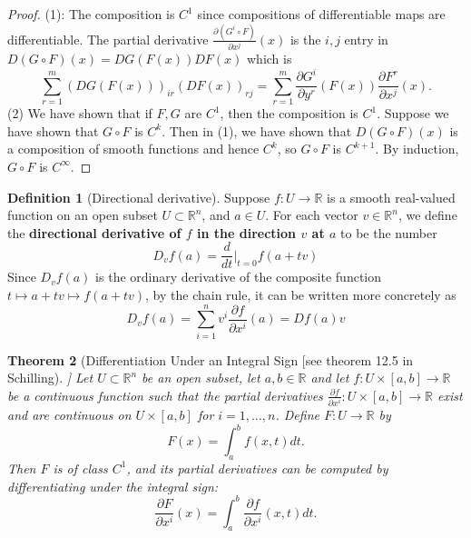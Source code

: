 \documentclass[reqno]{amsart}
\theoremstyle{plain}%
\newtheorem{theorem}{Theorem}[section]
\theoremstyle{definition}
\newtheorem{definition}[theorem]{Definition}
\theoremstyle{remark}
\begin{document}
        \begin{proof}
        (1): The composition is $C^{1}$ since compositions of differentiable maps
        are differentiable. The partial derivative
        $\frac{\partial \left( G^{i} \circ F \right) }{\partial x^{j}}(x)$ is the
        $i,j$ entry in $D\left( G \circ F \right)(x)
        = DG\left( F(x) \right) DF(x) $ which is
        \[
        \sum_{r=1}^{m} \left( DG \left( F(x) \right)  \right)_{i r}
        \left( DF(x) \right)_{rj}
        = \sum_{r=1}^{m} \frac{\partial G^{i}}{\partial y^{r}} \left( F(x) \right) 
        \frac{\partial F^{r}}{\partial x^{j}}(x).
        \] 
        (2) We have shown that if $F,G$ are $C^{1}$, then the composition is
        $C^{1}$. Suppose we have shown that  $G \circ F$ is $C^{k}$. Then
        in (1), we have shown that $D \left( G \circ F \right) (x)$ is
        a composition of smooth functions and hence $C^{k}$, so
        $G \circ F$ is $C^{k+1}$. By induction, $G \circ F$ is $C^{\infty}$.
        \end{proof}

        \begin{definition}[Directional derivative]
        Suppose $f  \colon U \to \mathbb{R}$ is a smooth real-valued function on an
        open subset $U \subset \mathbb{R}^{n}$, and $a \in U$. For each vector
        $v \in \mathbb{R}^{n}$, we define the \textbf{directional derivative of $f$ 
        in the direction $v$ at $a$} to be the number
        \[
        D_v f(a) = \frac{d}{dt}\Big|_{t=0} f\left( a+tv \right) 
        \] 
        Since $D_v f(a)$ is the ordinary derivative of the composite function
        $t \mapsto a+tv \mapsto f\left( a+tv \right) $, by the chain rule, it can
        be written more concretely as
        \[
        D_v f(a) = \sum_{i=1}^{n} v^{i} \frac{\partial f}{\partial x^{i}}(a)
        = Df(a) v
        \] 
        \end{definition}


        \begin{theorem}[Differentiation Under an Integral Sign [see theorem 12.5 in
        Schilling]]
        Let $U \subset \mathbb{R}^{n}$ be an open subset, let
        $a,b \in \mathbb{R}$ and let $f  \colon U \times \left[ a,b \right] 
        \to \mathbb{R}$ be a continuous function such that the partial derivatives
        $\frac{\partial f}{\partial x^{i}}  \colon U \times \left[ a,b \right] 
        \to \mathbb{R}$ exist and are continuous on $U \times \left[ a,b \right]
        $ for $i = 1,\ldots, n$. Define $F  \colon U \to \mathbb{R}$ by
        \[
        F(x) = \int_{a}^{b} f(x,t) dt. 
        \] 
        Then $F$ is of class $C^{1}$, and its partial derivatives can be computed
        by differentiating under the integral sign:
        \[
        \frac{\partial F}{\partial x^{i}}(x) = \int_{a}^{b} 
        \frac{\partial f}{\partial x^{i}} \left( x,t \right) dt.
        \] 
        \end{theorem}
\end{document}
